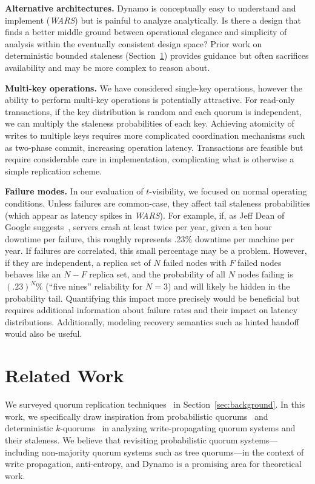\documentclass{vldb}
\newcommand{\sectionskip}{-0em}
\begin{document}
\textbf{Alternative architectures.} Dynamo is conceptually easy to
understand and implement (\textit{WARS}) but is painful to analyze
analytically.  Is there a design that finds a better middle ground
between operational elegance and simplicity of analysis within the
eventually consistent design space?  Prior work on deterministic
bounded staleness (Section~\ref{sec:relatedwork}) provides guidance
but often sacrifices availability and may be more complex to reason
about.

\textbf{Multi-key operations.} We have considered single-key
operations, however the ability to perform multi-key operations is
potentially attractive.  For read-only transactions, if the key
distribution is random and each quorum is independent, we can multiply
the staleness probabilities of each key.  Achieving atomicity of
writes to multiple keys requires more complicated coordination
mechanisms such as two-phase commit, increasing operation latency.
Transactions are feasible but require considerable care in
implementation, complicating what is otherwise a simple replication
scheme.

\textbf{Failure modes.} In our evaluation of $t$-visibility, we
focused on normal operating conditions. Unless failures are
common-case, they affect tail staleness probabilities (which appear as
latency spikes in \textit{WARS}).  For example, if, as Jeff Dean of
Google suggests~\cite{dean-keynote}, servers crash at least twice per
year, given a ten hour downtime per failure, this roughly represents
.23\% downtime per machine per year.  If failures are correlated, this
small percentage may be a problem. However, if they are independent, a
replica set of $N$ failed nodes with $F$ failed nodes behaves like an
$N-F$ replica set, and the probability of all $N$ nodes failing is
$(.23)^N$\% (``five nines'' reliability for $N$$=$$3$) and will likely
be hidden in the probability tail.  Quantifying this impact more
precisely would be beneficial but requires additional information
about failure rates and their impact on latency
distributions. Additionally, modeling recovery semantics such as
hinted handoff would also be useful.

\vspace{\sectionskip}\section{Related Work}
\label{sec:relatedwork}

We surveyed quorum replication
techniques~\cite{prob-quorum-dynamic, 92-quorums, treequorum, non-strict,
  multi-k-quorum, quorums-start, quorum-placement, partitionedquorum, quorums-alternative, prob-quorum,
  quorum-overview, quorumsystems} in Section~\ref{sec:background}.  In
this work, we specifically draw inspiration from probabilistic
quorums~\cite{prob-quorum} and deterministic
$k$-quorums~\cite{ non-strict, multi-k-quorum} in analyzing
write-propagating quorum systems and their staleness.  We believe that
revisiting probabilistic quorum systems---including non-majority
quorum systems such as tree quorums---in the context of write
propagation, anti-entropy, and Dynamo is a promising area for theoretical
work.
\end{document}
